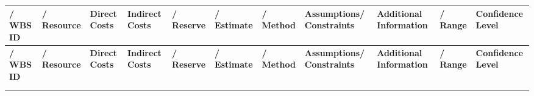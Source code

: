 \documentclass[10pt,letterpaper]{article}
\renewcommand\arraystretch{1.25}
\begin{document}
\begin{landscape}
\begin{center}
\begingroup
\setlength\tabcolsep{2.0pt}
\tiny
\renewcommand\arraystretch{1.55}
\begin{longtable}{|>{\raggedright\arraybackslash}p{0.711in}|>{\raggedright\arraybackslash}p{0.711in}|>{\raggedright\arraybackslash}p{0.711in}|>{\raggedright\arraybackslash}p{0.711in}|>{\raggedright\arraybackslash}p{0.711in}|>{\raggedright\arraybackslash}p{0.711in}|>{\raggedright\arraybackslash}p{0.711in}|>{\raggedright\arraybackslash}p{0.711in}|>{\raggedright\arraybackslash}p{0.711in}|>{\raggedright\arraybackslash}p{0.711in}|>{\raggedright\arraybackslash}p{0.711in}|}
\hline
\rowcolor{light}
\textbf{/ WBS ID} & \textbf{/ Resource} & \textbf{Direct Costs} & \textbf{Indirect Costs} & \textbf{/ Reserve} & \textbf{/ Estimate} & \textbf{/ Method} & \textbf{Assumptions/ Constraints} & \textbf{Additional Information} & \textbf{/ Range} & \textbf{Confidence Level} \\ \hline
\endfirsthead
\hline\rowcolor{light} \textbf{/ WBS ID} & \textbf{/ Resource} & \textbf{Direct Costs} & \textbf{Indirect Costs} & \textbf{/ Reserve} & \textbf{/ Estimate} & \textbf{/ Method} & \textbf{Assumptions/ Constraints} & \textbf{Additional Information} & \textbf{/ Range} & \textbf{Confidence Level} \\ \hline
\endhead
\rule{0pt}{11pt}\hspace{0pt} & \rule{0pt}{11pt}\hspace{0pt} & \rule{0pt}{11pt}\hspace{0pt} & \rule{0pt}{11pt}\hspace{0pt} & \rule{0pt}{11pt}\hspace{0pt} & \rule{0pt}{11pt}\hspace{0pt} & \rule{0pt}{11pt}\hspace{0pt} & \rule{0pt}{11pt}\hspace{0pt} & \rule{0pt}{11pt}\hspace{0pt} & \rule{0pt}{11pt}\hspace{0pt} & \rule{0pt}{11pt}\hspace{0pt} \\ \hline
\rule{0pt}{11pt}\hspace{0pt} & \rule{0pt}{11pt}\hspace{0pt} & \rule{0pt}{11pt}\hspace{0pt} & \rule{0pt}{11pt}\hspace{0pt} & \rule{0pt}{11pt}\hspace{0pt} & \rule{0pt}{11pt}\hspace{0pt} & \rule{0pt}{11pt}\hspace{0pt} & \rule{0pt}{11pt}\hspace{0pt} & \rule{0pt}{11pt}\hspace{0pt} & \rule{0pt}{11pt}\hspace{0pt} & \rule{0pt}{11pt}\hspace{0pt} \\ \hline

\end{longtable}
\end{center}
\end{landscape}
\end{document}
